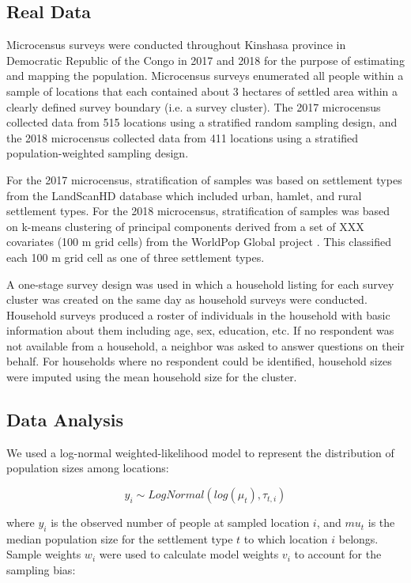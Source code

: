 \documentclass[9pt,twocolumn,twoside,lineno]{pnas-new}
\begin{document}
{	\subsection{Real Data}
	
	Microcensus surveys were conducted throughout Kinshasa province in Democratic Republic of the Congo in 2017 and 2018 for the purpose of estimating and mapping the population. Microcensus surveys enumerated all people within a sample of locations that each contained about 3 hectares of settled area within a clearly defined survey boundary (i.e. a survey cluster).  The 2017 microcensus collected data from 515 locations using a stratified random sampling design, and the 2018 microcensus collected data from 411 locations using a stratified population-weighted sampling design. 
	
	For the 2017 microcensus, stratification of samples was based on settlement types from the LandScanHD database \cite{} which included urban, hamlet, and rural settlement types. For the 2018 microcensus, stratification of samples was based on k-means clustering of principal components derived from a set of XXX covariates (100 m grid cells) from the WorldPop Global project \cite{}.  This classified each 100 m grid cell as one of three settlement types.
	
	A one-stage survey design was used in which a household listing for each survey cluster was created on the same day as household surveys were conducted.  Household surveys produced a roster of individuals in the household with basic information about them including age, sex, education, etc.  If no respondent was not available from a household, a neighbor was asked to answer questions on their behalf. For households where no respondent could be identified, household sizes were imputed using the mean household size for the cluster.
	
	\subsection{Data Analysis}
	
	We used a log-normal weighted-likelihood model to represent the distribution of population sizes among locations:
	
	\[ y_i \sim LogNormal( log( \mu_t ), \tau_{t,i} ) \]
	
	\noindent where $y_i$ is the observed number of people at sampled location $i$, and $mu_t$ is the median population size for the settlement type $t$ to which location $i$ belongs. Sample weights $w_i$ were used to calculate model weights $v_i$ to account for the sampling bias:
	
}
\end{document}
